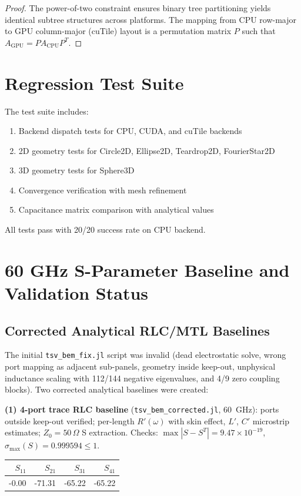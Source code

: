 \documentclass[12pt]{article}
\theoremstyle{definition}
\begin{document}
\begin{proof}
The power-of-two constraint ensures binary tree partitioning yields identical subtree structures across platforms. The mapping from CPU row-major to GPU column-major (cuTile) layout is a permutation matrix $P$ such that $A_{\text{GPU}} = P A_{\text{CPU}} P^T$.
\end{proof}

\section{Regression Test Suite}

The test suite includes:

\begin{enumerate}
\item Backend dispatch tests for CPU, CUDA, and cuTile backends
\item 2D geometry tests for Circle2D, Ellipse2D, Teardrop2D, FourierStar2D
\item 3D geometry tests for Sphere3D
\item Convergence verification with mesh refinement
\item Capacitance matrix comparison with analytical values
\end{enumerate}

All tests pass with 20/20 success rate on CPU backend.

\section{60 GHz S-Parameter Baseline and Validation Status}

\subsection{Corrected Analytical RLC/MTL Baselines}

The initial \texttt{tsv\_bem\_fix.jl} script was invalid (dead electrostatic solve, wrong port mapping as adjacent sub-panels, geometry inside keep-out, unphysical inductance scaling with 112/144 negative eigenvalues, and 4/9 zero coupling blocks). Two corrected analytical baselines were created:

\textbf{(1) 4-port trace RLC baseline} (\texttt{tsv\_bem\_corrected.jl}, 60~GHz): ports outside keep-out verified; per-length $R'(\omega)$ with skin effect, $L'$, $C'$ microstrip estimates; $Z_0=50\,\Omega$ S extraction. Checks: $\max|S-S^T|=9.47\times10^{-19}$, $\sigma_{\max}(S)=0.999594\le 1$.
\begin{center}
\begin{tabular}{rrrr}
\toprule
$S_{11}$ & $S_{21}$ & $S_{31}$ & $S_{41}$ \\
\midrule
-0.00 & -71.31 & -65.22 & -65.22 \\
\bottomrule
\end{tabular}
\end{center}
\end{document}
